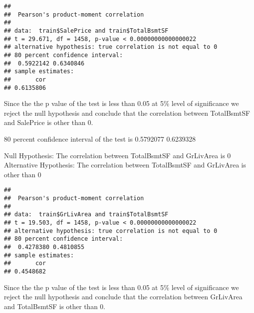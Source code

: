 \documentclass[]{article}
\newenvironment{Shaded}{\begin{snugshade}}{\end{snugshade}}
\newcommand{\DataTypeTok}[1]{\textcolor[rgb]{0.13,0.29,0.53}{#1}}
\newcommand{\FloatTok}[1]{\textcolor[rgb]{0.00,0.00,0.81}{#1}}
\newcommand{\KeywordTok}[1]{\textcolor[rgb]{0.13,0.29,0.53}{\textbf{#1}}}
\newcommand{\NormalTok}[1]{#1}
\newcommand{\OperatorTok}[1]{\textcolor[rgb]{0.81,0.36,0.00}{\textbf{#1}}}
\begin{document}
\begin{Shaded}
\end{Shaded}

\begin{verbatim}
## 
##  Pearson's product-moment correlation
## 
## data:  train$SalePrice and train$TotalBsmtSF
## t = 29.671, df = 1458, p-value < 0.00000000000000022
## alternative hypothesis: true correlation is not equal to 0
## 80 percent confidence interval:
##  0.5922142 0.6340846
## sample estimates:
##       cor 
## 0.6135806
\end{verbatim}

Since the the p value of the test is less than 0.05 at 5\% level of
significance we reject the null hypothesis and conclude that the
correlation between TotalBsmtSF and SalePrice is other than 0.

80 percent confidence interval of the test is 0.5792077 0.6239328

Null Hypothesis: The correlation between TotalBsmtSF and GrLivArea is 0
Alternative Hypothesis: The correlation between TotalBsmtSF and
GrLivArea is other than 0

\begin{Shaded}
\end{Shaded}

\begin{verbatim}
## 
##  Pearson's product-moment correlation
## 
## data:  train$GrLivArea and train$TotalBsmtSF
## t = 19.503, df = 1458, p-value < 0.00000000000000022
## alternative hypothesis: true correlation is not equal to 0
## 80 percent confidence interval:
##  0.4278380 0.4810855
## sample estimates:
##       cor 
## 0.4548682
\end{verbatim}

Since the the p value of the test is less than 0.05 at 5\% level of
significance we reject the null hypothesis and conclude that the
correlation between GrLivArea and TotalBsmtSF is other than 0.
\end{document}
